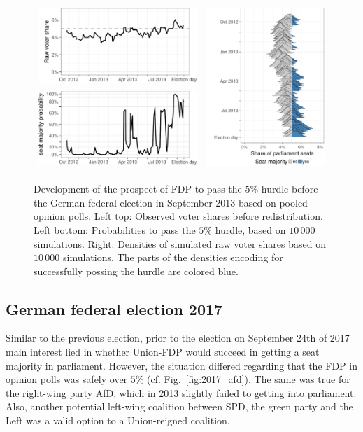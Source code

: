\documentclass[smallcondensed]{svjour3}     %
\begin{document}
\begin{figure}[H]\centering
\begin{tabular}{ll}
\includegraphics[height=.15\textwidth]{figures/2013_pooled_fdp_rawShares.pdf}
&
\multirow{2}{*}[13ex]{\includegraphics[height=30ex]{figures/2013_pooled_fdp_ridgeline.pdf}}
\\
\includegraphics[height=.15\textwidth]{figures/2013_pooled_fdp_passingProb.pdf}
\end{tabular}
\caption{Development of the prospect of FDP to pass the $5\%$ hurdle before the German federal election in September 2013 based on pooled opinion polls.
Left top: Observed voter shares before redistribution. Left bottom: Probabilities to pass the $5\%$ hurdle, based on $10\,000$ simulations. Right: Densities of simulated raw voter shares based on $10\,000$ simulations. The parts of the densities encoding for successfully possing the hurdle are colored blue.
\label{fig:2013_fdp}
}
\end{figure}





\subsection{German federal election 2017} \label{subsec:2017}
Similar to the previous election, prior to the election on
September 24th of 2017 main interest lied in whether Union-FDP
would succeed in getting a seat majority in parliament.
However, the situation differed regarding that the FDP in opinion
polls was safely over $5\%$ (cf. Fig.~\ref{fig:2017_afd}).
The same was true for the right-wing party AfD, which in 2013
slightly failed to getting into parliament. Also, another potential
left-wing coalition between SPD, the green party and the Left
was a valid option to a Union-reigned coalition.
\end{document}
